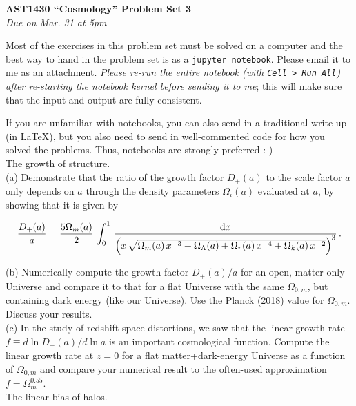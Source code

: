 \documentclass[12pt]{article}
\begin{document}
\begin{center}
{\bf \LARGE AST1430 ``Cosmology'' Problem Set 3}\\[7pt]
\emph{Due on Mar. 31 at 5pm}\\[7pt]
\end{center}

Most of the exercises in this problem set must be solved on a computer
and the best way to hand in the problem set is as a \texttt{jupyter
  notebook}. Please email it to me as an attachment. 
  \emph{Please re-run the entire notebook (with \texttt{Cell
    > Run All}) after re-starting the notebook kernel before sending it
  to me}; this will make sure that the input and output are fully
consistent.

If you are unfamiliar with notebooks, you can also send in a
traditional write-up (in LaTeX), but you also need to send in
well-commented code for how you solved the problems. Thus, notebooks
are strongly preferred :-)\\

 The growth of structure.\\

(a) Demonstrate that the ratio of the growth factor $D_+(a)$ to the scale factor $a$ only depends on $a$ through the density parameters $\Omega_i(a)$ evaluated at $a$, by showing that it is given by
    
\begin{equation}
    {D_+(a) \over a} = {5\Omega_{m}(a) \over 2}\,\int_0^1\,\frac{\mathrm{d}x}{\left(x\,\sqrt{\Omega_{m}(a)\,x^{-3} + \Omega_{\Lambda}(a)+\Omega_{r}(a)\,x^{-4}+\Omega_{k}(a)\,x^{-2}}\right)^3}\,.
\end{equation}

(b) Numerically compute the growth factor $D_+(a)/a$ for an open, matter-only Universe and compare it to that for a flat Universe with the same $\Omega_{0,m}$, but containing dark energy (like our Universe). Use the Planck (2018) value for $\Omega_{0,m}$. Discuss your results.\\

(c) In the study of redshift-space distortions, we saw that the linear growth rate $f \equiv d\ln D_+(a)/d\ln a$ is an important cosmological function. Compute the linear growth rate at $z=0$ for a flat matter+dark-energy Universe as a function of $\Omega_{0,m}$ and compare your numerical result to the often-used approximation $f = \Omega_{m}^{0.55}$.\\

 The linear bias of halos.\\
\end{document}
